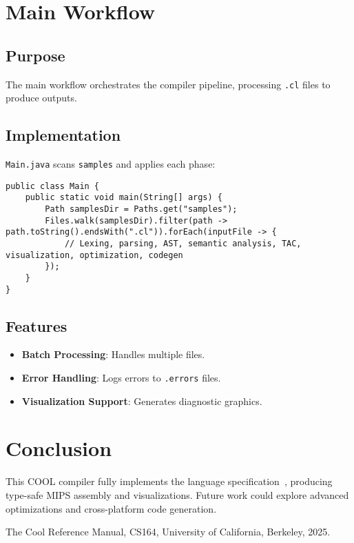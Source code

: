 \documentclass[11pt, titlepage]{article}
\begin{document}
\section{Main Workflow}
\label{sec:workflow}

\subsection{Purpose}
The main workflow orchestrates the compiler pipeline, processing \texttt{.cl} files to produce outputs.

\subsection{Implementation}
\texttt{Main.java} scans \texttt{samples} and applies each phase:

\begin{lstlisting}
public class Main {
    public static void main(String[] args) {
        Path samplesDir = Paths.get("samples");
        Files.walk(samplesDir).filter(path -> path.toString().endsWith(".cl")).forEach(inputFile -> {
            // Lexing, parsing, AST, semantic analysis, TAC, visualization, optimization, codegen
        });
    }
}
\end{lstlisting}

\subsection{Features}
\begin{itemize}[leftmargin=*]
    \item \textbf{Batch Processing}: Handles multiple files.
    \item \textbf{Error Handling}: Logs errors to \texttt{.errors} files.
    \item \textbf{Visualization Support}: Generates diagnostic graphics.
\end{itemize}

\section{Conclusion}
\label{sec:conclusion}

This COOL compiler fully implements the language specification~\cite{cool_manual}, producing type-safe MIPS assembly and visualizations. Future work could explore advanced optimizations and cross-platform code generation.

\begin{thebibliography}{1}
The Cool Reference Manual, CS164, University of California, Berkeley, 2025.
\end{thebibliography}
\end{document}
